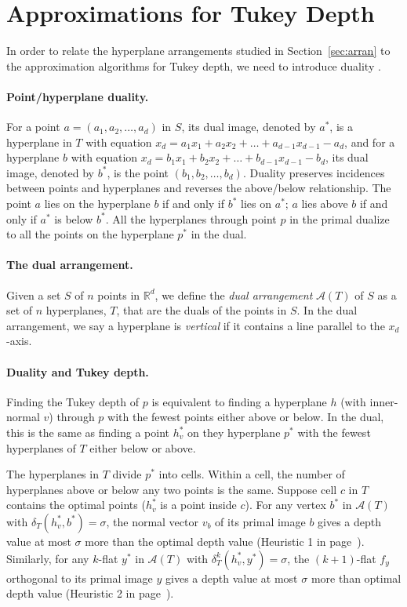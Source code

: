 \documentclass[preprint, 12pt]{elsarticle}
\begin{document}
\section{Approximations for Tukey Depth}
\label{sec:approx}

In order to relate the hyperplane arrangements studied in Section~\ref{sec:arran} to the approximation algorithms for Tukey depth, we need to introduce duality \cite{Edel87}. 

\paragraph{Point/hyperplane duality.}
For a point $a = (a_{1}, a_{2}, \ldots, a_{d})$ in $S$, its dual image, denoted by $a^{*}$, is a hyperplane in $T$ with equation $x_{d} = a_{1}x_{1} + a_{2}x_{2} + \ldots + a_{d-1}x_{d-1} - a_{d}$, and for a hyperplane $b$ with equation $x_{d} = b_{1}x_{1} + b_{2}x_{2} + \ldots + b_{d-1}x_{d-1} - b_{d}$, its dual image, denoted by $b^{*}$, is the point $(b_{1}, b_{2}, \ldots, b_{d})$. 
Duality preserves incidences between points and hyperplanes and reverses the above/below relationship.  The point $a$ lies on the hyperplane $b$ if and only if $b^{*}$ lies on $a^{*}$; $a$ lies above $b$ if and only if $a^{*}$ is below $b^{*}$. All the hyperplanes through point $p$ in the primal dualize to all the points on the hyperplane $p^{*}$ in the dual.

\paragraph{The dual arrangement.}
Given a set $S$ of $n$ points in $\mathbb{R}^{d}$, we define the \emph{dual arrangement} $\mathcal{A}(T)$ of $S$ as a set of $n$ hyperplanes, $T$, that are the duals of the points in $S$.
In the dual arrangement, we say a hyperplane is \emph{vertical} if it contains a line parallel to the $x_{d}$-axis.

\paragraph{Duality and Tukey depth.}
Finding the Tukey depth of $p$ is equivalent to finding a hyperplane $h$ (with inner-normal $v$) through $p$ with the fewest points either above or below. In the dual, this is the same as finding a point $h_{v}^{*}$ on they hyperplane $p^{*}$ with the fewest hyperplanes of $T$ either below or above. 

The hyperplanes in $T$ divide $p^{*}$ into cells. Within a cell,
the number of hyperplanes above or below any two points is the same.
Suppose cell $c$ in $T$ contains the optimal points ($h_{v}^{*}$ is
a point inside $c$). For any vertex $b^{*}$ in $\mathcal{A}(T)$ with
$\delta_{T}(h_{v}^{*},b^{*}) = \sigma$, the normal vector $v_{b}$ of its
primal image $b$ gives a depth value at most $\sigma$ more than the optimal depth
value (Heuristic 1 in page~\pageref{page:heuristic1}). Similarly, for any
$k$-flat $y^{*}$ in $\mathcal{A}(T)$ with $\delta_{T}^{k}(h_{v}^{*},y^{*})
= \sigma$, the $(k+1)$-flat $f_{y}$ orthogonal to its primal image $y$
gives a depth value at most $\sigma$ more than optimal depth value (Heuristic
2 in page~\pageref{page:heuristic2}).
\end{document}
